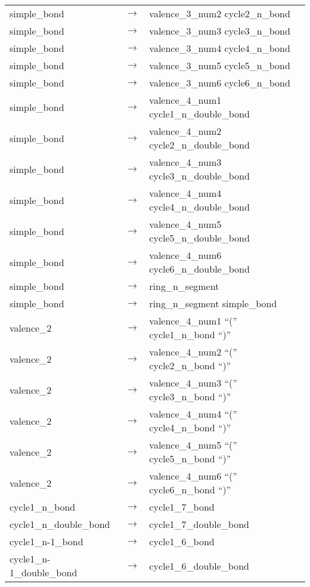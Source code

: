 \documentclass[../Document.tex]{subfiles}
\begin{document}
\begin{longtable}{m{} p{} p{}}
    simple\_bond & $\rightarrow$ & valence\_3\_num2 cycle2\_n\_bond \\
    simple\_bond & $\rightarrow$ & valence\_3\_num3 cycle3\_n\_bond \\
    simple\_bond & $\rightarrow$ & valence\_3\_num4 cycle4\_n\_bond \\
    simple\_bond & $\rightarrow$ & valence\_3\_num5 cycle5\_n\_bond \\
    simple\_bond & $\rightarrow$ & valence\_3\_num6 cycle6\_n\_bond \\
    simple\_bond & $\rightarrow$ & valence\_4\_num1 cycle1\_n\_double\_bond \\
    simple\_bond & $\rightarrow$ & valence\_4\_num2 cycle2\_n\_double\_bond \\
    simple\_bond & $\rightarrow$ & valence\_4\_num3 cycle3\_n\_double\_bond \\
    simple\_bond & $\rightarrow$ & valence\_4\_num4 cycle4\_n\_double\_bond \\
    simple\_bond & $\rightarrow$ & valence\_4\_num5 cycle5\_n\_double\_bond \\
    simple\_bond & $\rightarrow$ & valence\_4\_num6 cycle6\_n\_double\_bond \\
    simple\_bond & $\rightarrow$ & ring\_n\_segment \\
    simple\_bond & $\rightarrow$ & ring\_n\_segment simple\_bond \\
    valence\_2 & $\rightarrow$ & valence\_4\_num1 ``('' cycle1\_n\_bond ``)'' \\
    valence\_2 & $\rightarrow$ & valence\_4\_num2 ``('' cycle2\_n\_bond ``)'' \\
    valence\_2 & $\rightarrow$ & valence\_4\_num3 ``('' cycle3\_n\_bond ``)'' \\
    valence\_2 & $\rightarrow$ & valence\_4\_num4 ``('' cycle4\_n\_bond ``)'' \\
    valence\_2 & $\rightarrow$ & valence\_4\_num5 ``('' cycle5\_n\_bond ``)'' \\
    valence\_2 & $\rightarrow$ & valence\_4\_num6 ``('' cycle6\_n\_bond ``)'' \\
    cycle1\_n\_bond & $\rightarrow$ & cycle1\_7\_bond \\
    cycle1\_n\_double\_bond & $\rightarrow$ & cycle1\_7\_double\_bond \\
    cycle1\_n-1\_bond & $\rightarrow$ & cycle1\_6\_bond \\
    cycle1\_n-1\_double\_bond & $\rightarrow$ & cycle1\_6\_double\_bond \\

\end{longtable}
\end{document}
